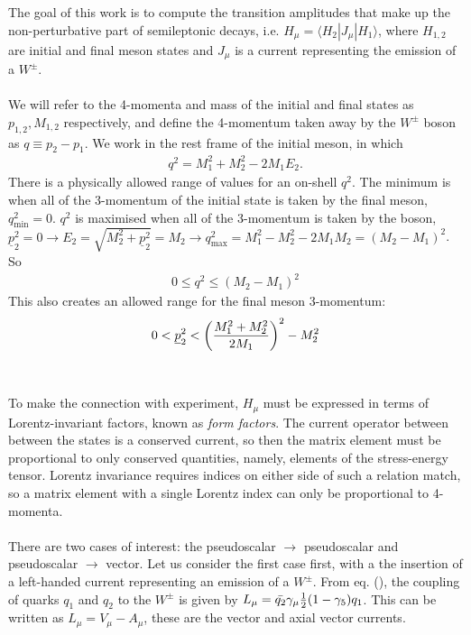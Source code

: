 The goal of this work is to compute the transition amplitudes that make up the non-perturbative part of semileptonic decays, i.e. $H_{\mu} = \langle H_2 | J_{\mu} | H_1 \rangle$, where $H_{1,2}$ are initial and final meson states and $J_{\mu}$ is a current representing the emission of a $W^{\pm}$. 
\\ \\
We will refer to the 4-momenta and mass of the initial and final states as $p_{1,2},M_{1,2}$ respectively, and define the 4-momentum taken away by the $W^{\pm}$ boson as $q \equiv p_2 - p_1$. We work in the rest frame of the initial meson, in which
\begin{align}
	q^2 = M_1^2 + M_2^2 - 2M_1 E_2.
\end{align}
There is a physically allowed range of values for an on-shell $q^2$. The minimum is when all of the 3-momentum of the initial state is taken by the final meson, $q_{\text{min}} ^2 = 0$. $q^2$ is maximised when all of the 3-momentum is taken by the boson, $\underline{p}_2^2 = 0 \rightarrow E_2 = \sqrt{M_2^2 + \underline{p}_2^2 } = M_2 \rightarrow q_{\text{max}}^2 = M_1^2 - M_2^2 - 2M_1M_2 = ( M_2 - M_1 )^2$. So
\begin{align}
	0 \leq q^2 \leq ( M_2 - M_1 )^2
\end{align}
This also creates an allowed range for the final meson 3-momentum:
\begin{align}
	0 < \underline{p}_{2}^2 < \left( M_1^2 + M_2^2 \over 2M_1 \right)^2 - M_2^2
\end{align}
\\ \\
To make the connection with experiment, $H_{\mu}$ must be expressed in terms of Lorentz-invariant factors, known as {\it{form factors}}. The current operator between between the states is a conserved current, so then the matrix element must be proportional to only conserved quantities, namely, elements of the stress-energy tensor. Lorentz invariance requires indices on either side of such a relation match, so a matrix element with a single Lorentz index can only be proportional to 4-momenta.
\\ \\
There are two cases of interest: the pseudoscalar $\to$ pseudoscalar and pseudoscalar $\to$ vector. Let us consider the first case first, with a the insertion of a left-handed current representing an emission of a $W^{\pm}$. From eq. ({\color{red}{weak decays section}}), the coupling of quarks $q_1$ and $q_2$ to the $W^{\pm}$ is given by  $L_{\mu} = \bar{q_2} \gamma_{\mu} {1\over2}(1-\gamma_5) q_1$. This can be written as $L_{\mu} = V_{\mu} - A_{\mu}$, these are the vector and axial vector currents.
